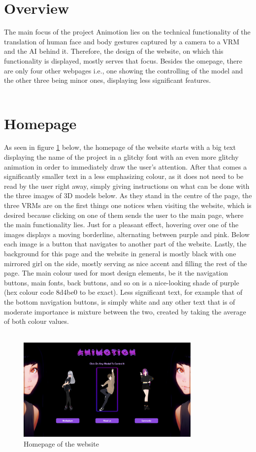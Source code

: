 \section{Overview}
The main focus of the project Animotion lies on the technical functionality 
of the translation of human face and body gestures captured by a camera to 
a VRM and the AI behind it. Therefore, the design of the website, on which
this functionality is displayed, mostly serves that focus. Besides the 
omepage, there are only four other webpages i.e., one showing the controlling 
of the model and the other three being minor ones, displaying less significant 
features.
\\
\\
\section{Homepage}
As seen in figure \ref{fig:homepage} below, the homepage of the website starts with a big text
displaying the name of the project in a glitchy font with an even more glitchy
animation in order to immediately draw the user's attention. After that comes a
significantly smaller text in a less emphasizing colour, as it does not need to
be read by the user right away, simply giving instructions on what can be done
with the three images of 3D models below. As they stand in the centre of the page,
the three VRMs are on the first things one notices when visiting the website, which
is desired because clicking on one of them sends the user to the main page, where
the main functionality lies. Just for a pleasant effect, hovering over one of the
images displays a moving borderline, alternating between purple and pink. Below
each image is a button that navigates to another part of the website. Lastly, the
background for this page and the website in general is mostly black with one mirrored
girl on the side, mostly serving as nice accent and filling the rest of the page.
The main colour used for most design elements, be it the navigation buttons, main
fonts, back buttons, and so on is a nice-looking shade of purple (hex colour code 8d4be0 to be exact). 
Less significant text, for example that of the bottom navigation
buttons, is simply white and any other text that is of moderate importance is mixture
between the two, created by taking the average of both colour values. 
\\
\\
\begin{figure}[htb]
    \centering
    \includegraphics[width=0.8\textwidth]{pics/Animotion_homepage.png}
    \caption{Homepage of the website}
    \label{fig:homepage}
\end{figure}
